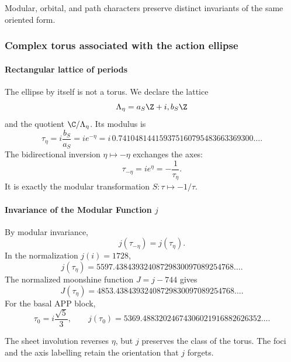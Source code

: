 \noindent Modular, orbital, and path characters preserve distinct invariants of the same oriented form.\par\medskip

\subsubsection{Complex torus associated with the action ellipse}

\paragraph{Rectangular lattice of periods}

The ellipse by itself is not a torus. We declare the lattice
\begin{equation}
\Lambda_\eta=a_S\Z+i,b_S\Z
\label{eq:lattice}
\end{equation}
and the quotient \(\C/\Lambda_\eta\). Its modulus is
\begin{equation}
\tau_\eta=i\frac{b_S}{a_S}=ie^{-\eta}
=i\,0.741048144159375160795483663369300\ldots.
\label{eq:tau-eta}
\end{equation}
The bidirectional inversion \(\eta\mapsto-\eta\) exchanges the axes:
\begin{equation}
\tau_{-\eta}=ie^\eta=-\frac1{\tau_\eta}.
\label{eq:modular-S}
\end{equation}
It is exactly the modular transformation \(S:\tau\mapsto-1/\tau\).

\paragraph{Invariance of the Modular Function \(j\)}

By modular invariance,
\begin{equation}
\boxed{j(\tau_{-\eta})=j(\tau_\eta).}
\label{eq:j-invariance}
\end{equation}
In the normalization \(j(i)=1728\),
\[
j(\tau_\eta)
=5597.43843932408729830097089254768\ldots.
\]
The normalized moonshine function \(J=j-744\) gives
\[
J(\tau_\eta)
=4853.43843932408729830097089254768\ldots.
\]
For the basal APP block,
\[
\tau_0=i\frac{\sqrt5}{3},
\qquad
j(\tau_0)=5369.48832024674306021916882626352\ldots.
\]

\begin{proposition}
The sheet involution reverses \(\eta\), but \(j\) preserves the class of the
torus. The foci and the axis labelling retain the orientation that \(j\)
forgets.
\end{proposition}

